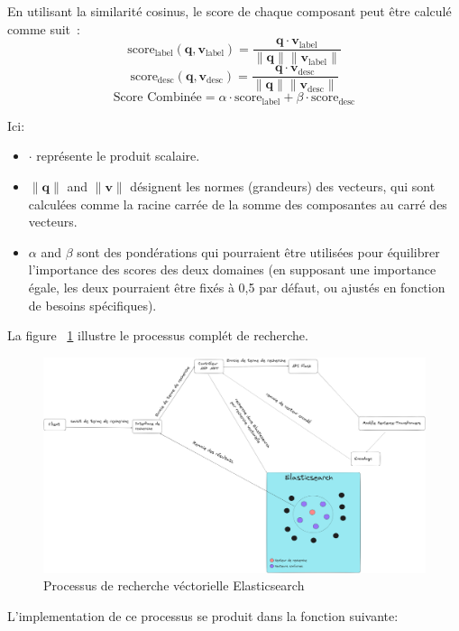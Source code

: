 \noindent
En utilisant la similarité cosinus, le score de chaque composant peut être calculé comme suit :
\[
	\text{score}_{\text{label}}(\mathbf{q}, \mathbf{v}_{\text{label}}) = \frac{\mathbf{q} \cdot \mathbf{v}_{\text{label}}}{\|\mathbf{q}\| \|\mathbf{v}_{\text{label}}\|}
\]
\[
	\text{score}_{\text{desc}}(\mathbf{q}, \mathbf{v}_{\text{desc}}) = \frac{\mathbf{q} \cdot \mathbf{v}_{\text{desc}}}{\|\mathbf{q}\| \|\mathbf{v}_{\text{desc}}\|}
\]
\[
	\text{Score Combinée} = \alpha \cdot \text{score}_{\text{label}} + \beta \cdot \text{score}_{\text{desc}}
\]

\noindent
Ici:
\begin{itemize}
	\item \( \cdot \) représente le produit scalaire.
	\item \( \|\mathbf{q}\| \) and \( \|\mathbf{v}\| \) désignent les normes (grandeurs) des vecteurs, qui sont calculées comme la racine carrée de la somme des composantes au carré des vecteurs.
	\item \( \alpha \) and \( \beta \) sont des pondérations qui pourraient être utilisées pour équilibrer l'importance des scores des deux domaines (en supposant une importance égale, les deux pourraient être fixés à 0,5 par défaut, ou ajustés en fonction de besoins spécifiques).
\end{itemize}

\noindent
La figure ~\ref{fig:vectorsearch} illustre le processus complét de recherche.

\begin{figure}[H]
	\centering
	\includegraphics[width=1\textwidth]{logos/vectorsearch.png}
	\caption{Processus de recherche véctorielle Elasticsearch}
	\label{fig:vectorsearch}
\end{figure}

\noindent
L'implementation de ce processus se produit dans la fonction suivante:

